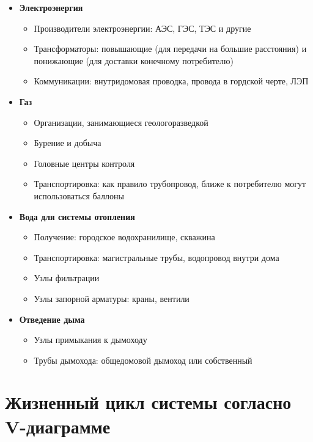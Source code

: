 \documentclass[bibliography=totocnumbered]{scrartcl}
\begin{document}
\begin{itemize}
  \item
    \textbf{Электроэнергия}
    \begin{itemize}
      \item Производители электроэнергии: АЭС, ГЭС, ТЭС и другие
      \item Трансформаторы: повышающие (для передачи на большие расстояния) и понижающие (для доставки конечному потребителю)   
      \item Коммуникации: внутридомовая проводка, провода в гордской черте, ЛЭП
    \end{itemize}
  
  \item
    \textbf{Газ}
    \begin{itemize}
      \item Организации, занимающиеся геологоразведкой
      \item Бурение и добыча
      \item Головные центры контроля
      \item Транспортировка: как правило трубопровод, ближе к потребителю могут использоваться баллоны
    \end{itemize}
  
  \item
    \textbf{Вода для системы отопления}
    \begin{itemize}
      \item Получение: городское водохранилище, скважина
      \item Транспортировка: магистральные трубы, водопровод внутри дома
      \item Узлы фильтрации
      \item Узлы запорной арматуры: краны, вентили
    \end{itemize}
  
  \item
    \textbf{Отведение дыма}
    \begin{itemize}
      \item Узлы примыкания к дымоходу
      \item Трубы дымохода: общедомовой дымоход или собственный
    \end{itemize}
\end{itemize}

\section{Жизненный цикл системы согласно V-диаграмме}
\end{document}
